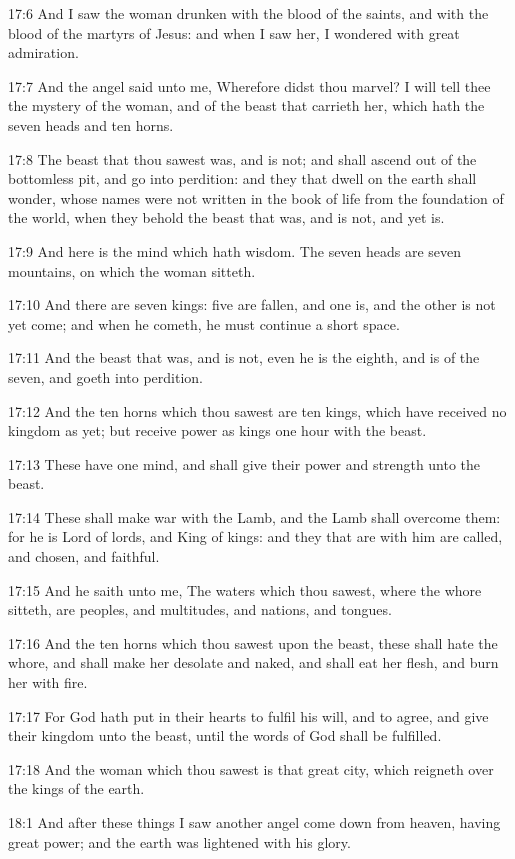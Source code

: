 17:6 And I saw the woman drunken with the blood of the saints, and with the blood of the martyrs of Jesus: and when I saw her, I wondered with great admiration.

17:7 And the angel said unto me, Wherefore didst thou marvel? I will tell thee the mystery of the woman, and of the beast that carrieth her, which hath the seven heads and ten horns.

17:8 The beast that thou sawest was, and is not; and shall ascend out of the bottomless pit, and go into perdition: and they that dwell on the earth shall wonder, whose names were not written in the book of life from the foundation of the world, when they behold the beast that was, and is not, and yet is.

17:9 And here is the mind which hath wisdom. The seven heads are seven mountains, on which the woman sitteth.

17:10 And there are seven kings: five are fallen, and one is, and the other is not yet come; and when he cometh, he must continue a short space.

17:11 And the beast that was, and is not, even he is the eighth, and is of the seven, and goeth into perdition.

17:12 And the ten horns which thou sawest are ten kings, which have received no kingdom as yet; but receive power as kings one hour with the beast.

17:13 These have one mind, and shall give their power and strength unto the beast.

17:14 These shall make war with the Lamb, and the Lamb shall overcome them: for he is Lord of lords, and King of kings: and they that are with him are called, and chosen, and faithful.

17:15 And he saith unto me, The waters which thou sawest, where the whore sitteth, are peoples, and multitudes, and nations, and tongues.

17:16 And the ten horns which thou sawest upon the beast, these shall hate the whore, and shall make her desolate and naked, and shall eat her flesh, and burn her with fire.

17:17 For God hath put in their hearts to fulfil his will, and to agree, and give their kingdom unto the beast, until the words of God shall be fulfilled.

17:18 And the woman which thou sawest is that great city, which reigneth over the kings of the earth.

18:1 And after these things I saw another angel come down from heaven, having great power; and the earth was lightened with his glory.


